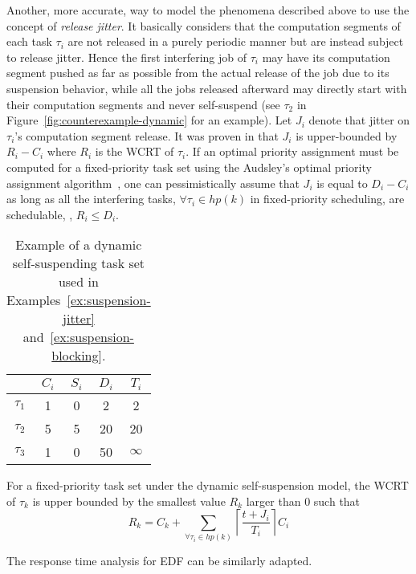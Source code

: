 Another, more accurate, way to model the phenomena described above to use the concept of \emph{release jitter}. It basically considers 
that the computation segments of each task $\tau_i$ are not released in a purely periodic manner but are instead subject to release jitter. 
Hence the first interfering job of $\tau_i$ may have its computation segment pushed as far as possible from the actual release of the job 
due to its suspension behavior, while all the jobs released afterward may directly start with their computation segments and never 
self-suspend (see $\tau_2$ in Figure~\ref{fig:counterexample-dynamic} for an example). Let $J_i$ denote that jitter on $\tau_i$'s computation segment release. 
It was proven in \cite{ecrts15nelissen,BletsasReport2015} that $J_i$ is upper-bounded by $R_i-C_i$ where $R_i$ is the WCRT of $\tau_i$. 
If an optimal priority assignment must be computed for a fixed-priority task set using the Audsley's optimal priority assignment 
algorithm~\cite{Audsley1991aOPA}, one can pessimistically assume that $J_i$ is equal to $D_i-C_i$ \cite{huangpass:dac2015,Raj:suspension1991} 
as long as all the interfering tasks, \ie $\forall \tau_i \in hp(k)$ in fixed-priority scheduling, are schedulable, \ie, $R_i \leq D_i$.


\begin{table}[t]
\centering
    \begin{tabular}{|c|c|c|c|c|}
 \hline
        & $C_i$ &  $S_i$&  $D_i$ & $T_i$\\ 
        \hline
        $\tau_1$ & 1 & 0 &  2 & 2\\ 
        $\tau_2$ &  5&  5& 20 & 20 \\ 
        $\tau_3$ & 1 & 0  & 50 & $\infty$ \\ 
        \hline
    \end{tabular} 
    \caption{Example of a dynamic self-suspending task set used in Examples~\ref{ex:suspension-jitter} and~\ref{ex:suspension-blocking}.}
    \label{table:dynamic-example}
\end{table}

For a fixed-priority task set under the dynamic self-suspension model, the WCRT of $\tau_k$ is upper bounded by the smallest value $R_k$ 
larger than $0$ such that 
\begin{equation*}
R_k=C_k+ \sum_{\forall \tau_i \in hp(k)} \left\lceil \frac{t + J_i}{T_i} \right\rceil C_i
\end{equation*} 

The response time analysis for EDF can be similarly adapted.

